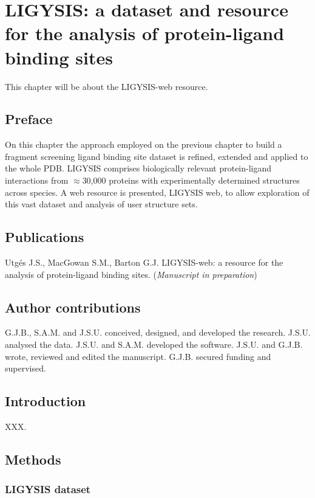 \chapter{LIGYSIS: a dataset and resource for the analysis of protein-ligand binding sites}

This chapter will be about the LIGYSIS-web resource.

\section*{Preface}

On this chapter the approach employed on the previous chapter to build a fragment screening ligand binding site dataset is refined, extended and applied to the whole PDB. LIGYSIS comprises biologically relevant protein-ligand interactions from $\approx$30,000 proteins with experimentally determined structures across species. A web resource is presented, LIGYSIS web, to allow exploration of this vast dataset and analysis of user structure sets.

\section*{Publications}

Utgés J.S., MacGowan S.M., Barton G.J. LIGYSIS-web: a resource for the analysis of protein-ligand binding sites. (\textit{Manuscript in preparation})

\section*{Author contributions}

G.J.B., S.A.M. and J.S.U. conceived, designed, and developed the research. J.S.U. analysed the data. J.S.U. and S.A.M. developed the software. J.S.U. and G.J.B. wrote, reviewed and edited the manuscript. G.J.B. secured funding and supervised.

\section{Introduction}

XXX.

\section{Methods}

\subsection{LIGYSIS dataset}

